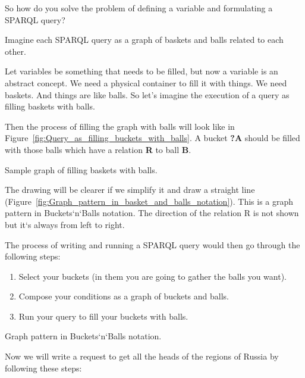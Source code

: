 So how do you solve the problem of defining a variable and formulating a SPARQL query?

Imagine each SPARQL query as a graph of baskets and balls related to each other. 

Let variables be something that needs to be filled, but now a variable is an abstract concept. We need a physical container to fill it with things. We need baskets. And things are like balls. So let's imagine the execution of a query as filling baskets with balls.

Then the process of filling the graph with balls will look like in Figure~\ref{fig:Query_as_filling_buckets_with_balls}. A bucket \textbf{?A} should be filled with those balls which have a relation \textbf{R} to ball \textbf{B}.

\begin{marginfigure}
	{
		\setlength{\fboxsep}{0pt}%
		\setlength{\fboxrule}{1pt}%
	}
    \caption{Sample graph of filling baskets with balls.}
	\label{fig:Query_as_filling_buckets_with_balls}
\end{marginfigure}

The drawing will be clearer if we simplify it and draw a straight line (Figure~\ref{fig:Graph_pattern_in_basket_and_balls_notation}). This is a graph pattern in Buckets`n`Balls notation. The direction of the relation R is not shown but it`s always from left to right.

\newpage
The process of writing and running a SPARQL query would then go through the following steps:
\begin{enumerate}
    \item Select your buckets (in them you are going to gather the balls you want).
    \item Compose your conditions as a graph of buckets and balls.
    \item Run your query to fill your buckets with balls.
\end{enumerate}

\begin{marginfigure}[-3cm]
	{
		\setlength{\fboxsep}{0pt}%
		\setlength{\fboxrule}{1pt}%
	}
    \caption{Graph pattern in Buckets`n`Balls notation.}
	\label{fig:Graph_pattern_in_basket_and_balls_notation}
\end{marginfigure}

Now we will write a request to get all the heads of the regions of Russia by following these steps:

